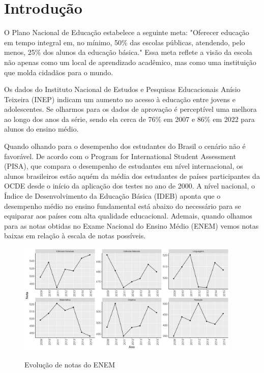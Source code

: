 \chapter{Introdução}

O Plano Nacional de Educação estabelece a seguinte meta: "Oferecer educação em tempo integral em, no mínimo, 50\% das escolas públicas, atendendo, pelo menos, 25\% dos alunos da educação básica." Essa meta reflete a visão da escola não apenas como um local de aprendizado acadêmico, mas como uma instituição que molda cidadãos para o mundo.

 Os dados do Instituto Nacional de Estudos e Pesquisas Educacionais Anísio Teixeira (INEP) indicam um aumento no acesso à educação entre jovens e adolescentes. Se olharmos para os dados de aprovação é perceptível uma melhora ao longo dos anos da série, sendo ela cerca de 76\% em 2007 e 86\% em 2022 para alunos do ensino médio.

Quando olhando para o desempenho dos estudantes do Brasil o cenário não é favorável. De acordo com o Program for International Student Assessment (PISA), que compara o desempenho de estudantes em nível internacional, os alunos brasileiros estão aquém da média dos estudantes de países participantes da OCDE desde o início da aplicação dos testes no ano de 2000. A nível nacional, o Índice de Desenvolvimento da Educação Básica (IDEB) aponta que o desempenho médio no ensino fundamental está abaixo do necessário para se equiparar aos países com alta qualidade educacional. Ademais, quando olhamos para as notas obtidas no Exame Nacional do Ensino Médio (ENEM) vemos notas baixas em relação à escala de notas possíveis.

\begin{figure}[H]
    \centering
    \caption{Evolução de notas do ENEM}
    \includegraphics[width=0.95\textwidth]{Charts/serie_media_notas.png}
    \label{fig:serie_medi_notas}
\end{figure}

